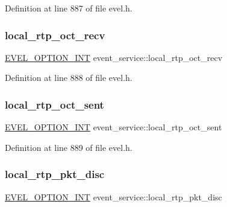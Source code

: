 Definition at line 887 of file evel.\+h.

\hypertarget{structevent__service_a55bec3b5cbf893aa866cccd5011bfbf7}{}\label{structevent__service_a55bec3b5cbf893aa866cccd5011bfbf7} 
\subsubsection{\texorpdfstring{local\+\_\+rtp\+\_\+oct\+\_\+recv}{local\_rtp\_oct\_recv}}
{\footnotesize\ttfamily \hyperlink{evel_8h_a452d825778d1c2368a54b8f689a25ba7}{E\+V\+E\+L\+\_\+\+O\+P\+T\+I\+O\+N\+\_\+\+I\+NT} event\+\_\+service\+::local\+\_\+rtp\+\_\+oct\+\_\+recv}



Definition at line 888 of file evel.\+h.

\hypertarget{structevent__service_a863833887eb2e138483e8e7f453c999a}{}\label{structevent__service_a863833887eb2e138483e8e7f453c999a} 
\subsubsection{\texorpdfstring{local\+\_\+rtp\+\_\+oct\+\_\+sent}{local\_rtp\_oct\_sent}}
{\footnotesize\ttfamily \hyperlink{evel_8h_a452d825778d1c2368a54b8f689a25ba7}{E\+V\+E\+L\+\_\+\+O\+P\+T\+I\+O\+N\+\_\+\+I\+NT} event\+\_\+service\+::local\+\_\+rtp\+\_\+oct\+\_\+sent}



Definition at line 889 of file evel.\+h.

\hypertarget{structevent__service_a669060c8c84973215d793b7e6ac9d979}{}\label{structevent__service_a669060c8c84973215d793b7e6ac9d979} 
\subsubsection{\texorpdfstring{local\+\_\+rtp\+\_\+pkt\+\_\+disc}{local\_rtp\_pkt\_disc}}
{\footnotesize\ttfamily \hyperlink{evel_8h_a452d825778d1c2368a54b8f689a25ba7}{E\+V\+E\+L\+\_\+\+O\+P\+T\+I\+O\+N\+\_\+\+I\+NT} event\+\_\+service\+::local\+\_\+rtp\+\_\+pkt\+\_\+disc}



